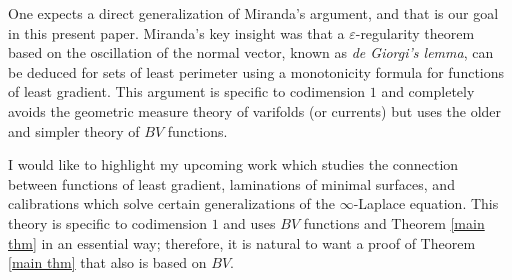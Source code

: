 \documentclass[reqno,11pt]{amsart}
\newcommand{\dfn}[1]{\emph{#1}\index{#1}}
\theoremstyle{definition}
\numberwithin{equation}{section}
\begin{document}
One expects a direct generalization of Miranda's argument, and that is our goal in this present paper.
Miranda's key insight was that a $\varepsilon$-regularity theorem based on the oscillation of the normal vector, known as \dfn{de Giorgi's lemma}, can be deduced for sets of least perimeter using a monotonicity formula for functions of least gradient.
This argument is specific to codimension $1$ and completely avoids the geometric measure theory of varifolds (or currents) but uses the older and simpler theory of $BV$ functions.

I would like to highlight my upcoming work \cite{BackusCML,BackusInfinityMaxwell1} which studies the connection between functions of least gradient, laminations of minimal surfaces, and calibrations which solve certain generalizations of the $\infty$-Laplace equation.
This theory is specific to codimension $1$ and uses $BV$ functions and Theorem \ref{main thm} in an essential way; therefore, it is natural to want a proof of Theorem \ref{main thm} that also is based on $BV$.

\end{document}
